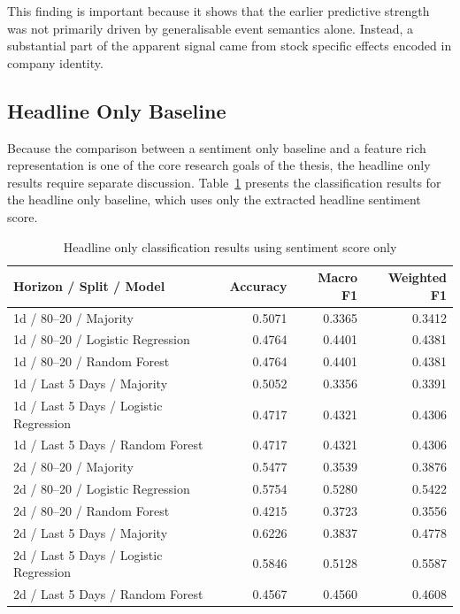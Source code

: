This finding is important because it shows that the earlier predictive strength was not primarily driven by generalisable event semantics alone. Instead, a substantial part of the apparent signal came from stock specific effects encoded in company identity.

\subsection{Headline Only Baseline}

Because the comparison between a sentiment only baseline and a feature rich representation is one of the core research goals of the thesis, the headline only results require separate discussion. Table~\ref{tab:headline_only_results} presents the classification results for the headline only baseline, which uses only the extracted headline sentiment score.

\begin{table}[htbp]
\centering
\caption{Headline only classification results using sentiment score only}
\label{tab:headline_only_results}
\begin{tabular}{llrrr}
\hline
\textbf{Horizon / Split / Model} & \textbf{} & \textbf{Accuracy} & \textbf{Macro F1} & \textbf{Weighted F1} \\
\hline
1d / 80--20 / Majority &  & 0.5071 & 0.3365 & 0.3412 \\
1d / 80--20 / Logistic Regression &  & 0.4764 & 0.4401 & 0.4381 \\
1d / 80--20 / Random Forest &  & 0.4764 & 0.4401 & 0.4381 \\
\hline
1d / Last 5 Days / Majority &  & 0.5052 & 0.3356 & 0.3391 \\
1d / Last 5 Days / Logistic Regression &  & 0.4717 & 0.4321 & 0.4306 \\
1d / Last 5 Days / Random Forest &  & 0.4717 & 0.4321 & 0.4306 \\
\hline
2d / 80--20 / Majority &  & 0.5477 & 0.3539 & 0.3876 \\
2d / 80--20 / Logistic Regression &  & 0.5754 & 0.5280 & 0.5422 \\
2d / 80--20 / Random Forest &  & 0.4215 & 0.3723 & 0.3556 \\
\hline
2d / Last 5 Days / Majority &  & 0.6226 & 0.3837 & 0.4778 \\
2d / Last 5 Days / Logistic Regression &  & 0.5846 & 0.5128 & 0.5587 \\
2d / Last 5 Days / Random Forest &  & 0.4567 & 0.4560 & 0.4608 \\
\hline
\end{tabular}
\end{table}

